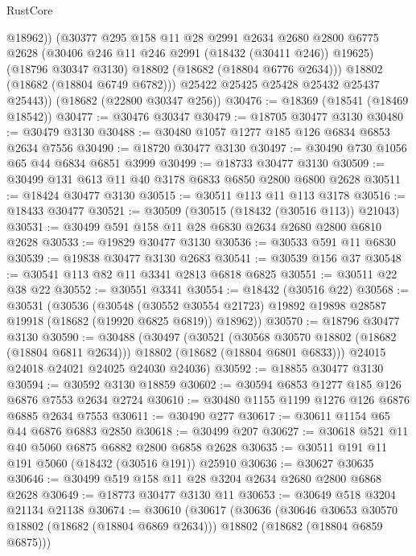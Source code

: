 \begin{lexlean}{RustCore}
\begin{coremodule}
              @18962))
          (@30377
            @295
            @158
            @11
            @28
            @2991
            @2634
            @2680
            @2800
            @6775
            @2628
            (@30406 @246 @11 @246 @2991 (@18432 (@30411 @246)) @19625)
            (@18796 @30347 @3130)
            @18802
            (@18682 (@18804 @6776 @2634)))
          @18802
          (@18682 (@18804 @6749 @6782)))
        @25422
        @25425
        @25428
        @25432
        @25437
        @25443))
    (@18682 (@22800 @30347 @256))
@30476 := @18369 (@18541 (@18469 @18542))
@30477 := @30476 @30347
@30479 := @18705 @30477 @3130
@30480 := @30479 @3130
@30488 := @30480 @1057 @1277 @185 @126 @6834 @6853 @2634 @7556
@30490 := @18720 @30477 @3130
@30497 := @30490 @730 @1056 @65 @44 @6834 @6851 @3999
@30499 := @18733 @30477 @3130
@30509 := @30499 @131 @613 @11 @40 @3178 @6833 @6850 @2800 @6800 @2628
@30511 := @18424 @30477 @3130
@30515 := @30511 @113 @11 @113 @3178
@30516 := @18433 @30477
@30521 := @30509 (@30515 (@18432 (@30516 @113)) @21043)
@30531 := @30499 @591 @158 @11 @28 @6830 @2634 @2680 @2800 @6810 @2628
@30533 := @19829 @30477 @3130
@30536 := @30533 @591 @11 @6830
@30539 := @19838 @30477 @3130 @2683
@30541 := @30539 @156 @37
@30548 := @30541 @113 @82 @11 @3341 @2813 @6818 @6825
@30551 := @30511 @22 @38 @22
@30552 := @30551 @3341
@30554 := @18432 (@30516 @22)
@30568 := @30531
    (@30536
      (@30548
        (@30552 @30554 @21723)
        @19892
        @19898
        @28587
        @19918
        (@18682 (@19920 @6825 @6819))
        @18962))
@30570 := @18796 @30477 @3130
@30590 := @30488
    (@30497
      (@30521
        (@30568 @30570 @18802 (@18682 (@18804 @6811 @2634)))
        @18802
        (@18682 (@18804 @6801 @6833)))
      @24015
      @24018
      @24021
      @24025
      @24030
      @24036)
@30592 := @18855 @30477 @3130
@30594 := @30592 @3130 @18859
@30602 := @30594 @6853 @1277 @185 @126 @6876 @7553 @2634 @2724
@30610 := @30480 @1155 @1199 @1276 @126 @6876 @6885 @2634 @7553
@30611 := @30490 @277
@30617 := @30611 @1154 @65 @44 @6876 @6883 @2850
@30618 := @30499 @207
@30627 := @30618 @521 @11 @40 @5060 @6875 @6882 @2800 @6858 @2628
@30635 := @30511 @191 @11 @191 @5060 (@18432 (@30516 @191)) @25910
@30636 := @30627 @30635
@30646 := @30499 @519 @158 @11 @28 @3204 @2634 @2680 @2800 @6868 @2628
@30649 := @18773 @30477 @3130 @11
@30653 := @30649 @518 @3204 @21134 @21138
@30674 := @30610
    (@30617
      (@30636
        (@30646 @30653 @30570 @18802 (@18682 (@18804 @6869 @2634)))
        @18802
        (@18682 (@18804 @6859 @6875)))

\end{coremodule}
\end{lexlean}
